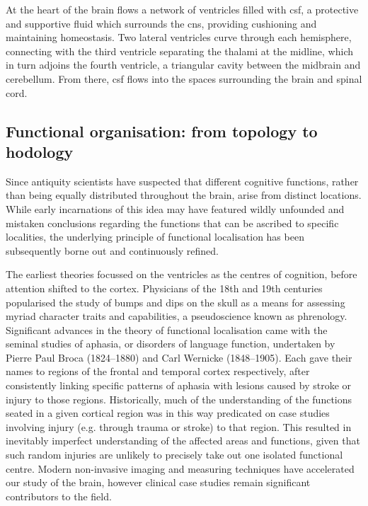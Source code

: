 At the heart of the brain flows a network of ventricles filled with \gls{csf}, a protective and supportive fluid which surrounds the \gls{cns}, providing cushioning and maintaining homeostasis.\autocite{Wichmann2022}
Two lateral ventricles curve through each hemisphere, connecting with the third ventricle separating the thalami at the midline, which in turn adjoins the fourth ventricle, a triangular cavity between the midbrain and cerebellum.
From there, \gls{csf} flows into the spaces surrounding the brain and spinal cord.

\subsection{Functional organisation: from topology to hodology}\label{sec:hodology}

Since antiquity scientists have suspected that different cognitive functions, rather than being equally distributed throughout the brain, arise from distinct locations.
While early incarnations of this idea may have featured wildly unfounded and mistaken conclusions regarding the functions that can be ascribed to specific localities, the underlying principle of functional localisation has been subsequently borne out and continuously refined.

The earliest theories focussed on the ventricles as the centres of cognition, before attention shifted to the cortex.\autocite{Folzenlogen2019}
Physicians of the 18th and 19th centuries popularised the study of bumps and dips on the skull as a means for assessing myriad character traits and capabilities, a pseudoscience known as phrenology.
Significant advances in the theory of functional localisation came with the seminal studies of aphasia, or disorders of language function, undertaken by Pierre Paul Broca (1824--1880) and Carl Wernicke (1848--1905).
Each gave their names to regions of the frontal and temporal cortex respectively, after consistently linking specific patterns of aphasia with lesions caused by stroke or injury to those regions.
Historically, much of the understanding of the functions seated in a given cortical region was in this way predicated on case studies involving injury (e.g. through trauma or stroke) to that region.
This resulted in inevitably imperfect understanding of the affected areas and functions, given that such random injuries are unlikely to precisely take out one isolated functional centre.
Modern non-invasive imaging and measuring techniques have accelerated our study of the brain, however clinical case studies remain significant contributors to the field.

